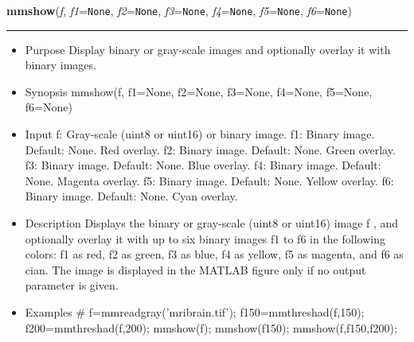     \begin{boxedminipage}{\textwidth}

    \raggedright \textbf{mmshow}(\textit{f}, \textit{f1}=\texttt{N\-o\-n\-e\-}, \textit{f2}=\texttt{N\-o\-n\-e\-}, \textit{f3}=\texttt{N\-o\-n\-e\-}, \textit{f4}=\texttt{N\-o\-n\-e\-}, \textit{f5}=\texttt{N\-o\-n\-e\-}, \textit{f6}=\texttt{N\-o\-n\-e\-})

    \vspace{-1.5ex}

    \rule{\textwidth}{0.5\fboxrule}
    \begin{itemize}
    \setlength{\parskip}{0.6ex}
      \item Purpose Display binary or gray-scale images and optionally 
        overlay it with binary images.

      \item Synopsis mmshow(f, f1=None, f2=None, f3=None, f4=None, f5=None, 
        f6=None)

      \item Input f: Gray-scale (uint8 or uint16) or binary image. f1: Binary 
        image. Default: None. Red overlay. f2: Binary image. Default: 
        None. Green overlay. f3: Binary image. Default: None. Blue 
        overlay. f4: Binary image. Default: None. Magenta overlay. f5: 
        Binary image. Default: None. Yellow overlay. f6: Binary image. 
        Default: None. Cyan overlay.

      \item Description Displays the binary or gray-scale (uint8 or uint16) 
        image f , and optionally overlay it with up to six binary images 
        f1 to f6 in the following colors: f1 as red, f2 as green, f3 as 
        blue, f4 as yellow, f5 as magenta, and f6 as cian. The image is 
        displayed in the MATLAB figure only if no output parameter is 
        given.

      \item Examples \# f=mmreadgray('mribrain.tif'); f150=mmthreshad(f,150); 
        f200=mmthreshad(f,200); mmshow(f); mmshow(f150); 
        mmshow(f,f150,f200);

    \end{itemize}

    \vspace{1ex}

    \end{boxedminipage}

    \label{multireg:num_pymorph:mmskelm}
    \vspace{0.5ex}

